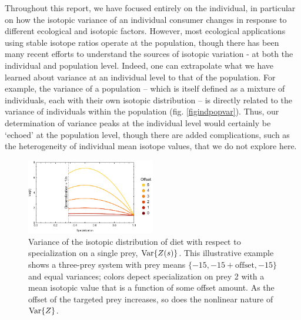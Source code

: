 \documentclass{frontiersSCNS}
\begin{document}



Throughout this report, we have focused entirely on the individual, in particular on how the isotopic variance of an individual consumer changes in response to different ecological and isotopic factors.
However, most ecological applications using stable isotope ratios operate at the population, though there has been many recent efforts to understand the sources of isotopic variation - at both the individual and population level.
Indeed, one can extrapolate what we have learned about variance at an individual level to that of the population.
For example, the variance of a population -- which is itself defined as a mixture of individuals, each with their own isotopic distribution -- is directly related to the variance of individuals within the population (fig. \ref{figindpopvar}).
Thus, our determination of variance peaks at the individual level would certainly be `echoed' at the population level, though there are added complications, such as the heterogeneity of individual mean isotope values, that we do not explore here.






\begin{figure}[h!]
\centering
\includegraphics[width=0.5\textwidth]{fig_var.pdf}
\caption{
Variance of the isotopic distribution of diet with respect to specialization on a single prey, ${\rm Var}\{Z(s)\}$.
This illustrative example shows a three-prey system with prey means $\{-15,-15+\mbox{offset},-15\}$ and equal variances; colors depect specialization on prey 2 with a mean isotopic value that is a function of some offset amount.
As the offset of the targeted prey increases, so does the nonlinear nature of ${\rm Var}\{Z\}$.
}
  \label{figvar}
\end{figure}
\end{document}
